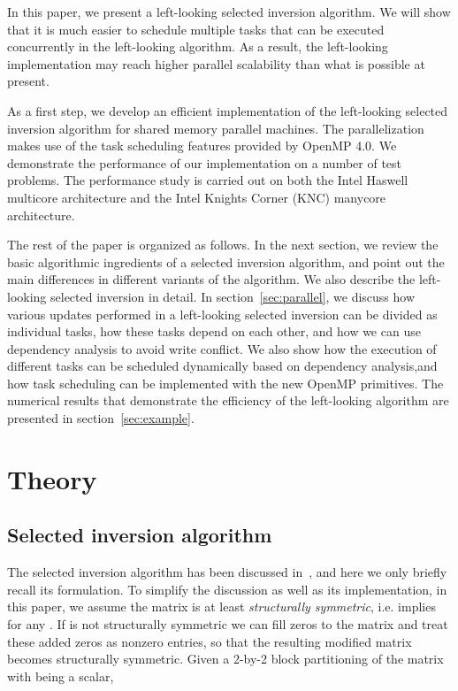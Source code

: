 \documentclass[10pt, conference, compsocconf,letterpaper,twocolumn]{IEEEtran}
\begin{document}
In this paper, we present a left-looking selected inversion algorithm. 
We will show that it is much easier to schedule multiple tasks 
that can be executed concurrently in the left-looking algorithm.
As a result, the left-looking implementation may reach higher 
parallel scalability than what is possible at present.



As a first step, we develop an efficient implementation of the left-looking 
selected inversion algorithm for shared memory parallel machines. 
The parallelization makes use of the task scheduling features provided by 
OpenMP 4.0. We demonstrate the performance of our implementation on a number 
of test problems. The performance study is carried out on both the Intel 
Haswell multicore architecture and the Intel Knights Corner (KNC) manycore 
architecture. 

The rest of the paper is organized as follows. In the next section, we review the basic algorithmic ingredients of a selected inversion algorithm, and point out the main differences in different variants of the algorithm. We also describe the left-looking selected inversion in detail. In section~\ref{sec:parallel}, we discuss how various updates performed in a left-looking selected inversion can be divided as individual tasks,  how these tasks depend on each other, and how we can use dependency analysis to avoid write conflict. We also show how the execution of different tasks can be scheduled
dynamically based on dependency analysis,and how task scheduling can be implemented with the new OpenMP primitives. The numerical results that demonstrate the efficiency of the left-looking algorithm are presented in section~\ref{sec:example}.








\section{Theory}

\subsection{Selected inversion algorithm}


The selected inversion algorithm has been discussed
                                    in~\cite{LinYangMezaEtAl2011,JacquelinLinYang2015}, and here
we only briefly recall its formulation.
To simplify the discussion as well as its implementation, in this paper, we
assume the matrix  is at least \textit{structurally symmetric}, i.e.
 implies  for any . If  is not
structurally symmetric we can fill zeros to the matrix  and treat
these added zeros as nonzero entries, so that the resulting modified
matrix becomes structurally symmetric.  Given a 2-by-2 block
partitioning of the matrix   with  being a scalar, 
\end{document}
